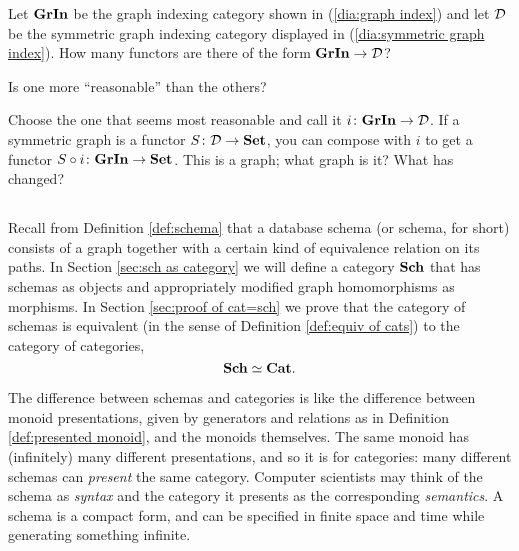 \documentclass[CT4S-EN-RU]{subfiles}
\begin{document}
\begin{exerciseRUS}
\end{exerciseRUS}

\begin{exerciseENG}
Let ${\mathbf{GrIn}}$ be the graph indexing category shown in (\ref{dia:graph index}) and let $\mathcal{D}$ be the symmetric graph indexing category displayed in (\ref{dia:symmetric graph index}).
\sexc How many functors are there of the form ${\mathbf{GrIn}}\rightarrow\mathcal{D}$?
\item Is one more “reasonable” than the others? 
\item Choose the one that seems most reasonable and call it $i\colon{\mathbf{GrIn}}\rightarrow\mathcal{D}$. If a symmetric graph is a functor $S\colon\mathcal{D}\rightarrow{\mathbf{Set}}$, you can compose with $i$ to get a functor $S\circ i\colon{\mathbf{GrIn}}\rightarrow{\mathbf{Set}}$. This is a graph; what graph is it? What has changed?
\endsexc
\end{exerciseENG}

\begin{exerciseRUS}
\end{exerciseRUS}


\subsection{}\label{sec:schemas and cats intro}

\begin{blockENG}
Recall from Definition \ref{def:schema} that a database schema (or schema, for short) consists of a graph together with a certain kind of equivalence relation on its paths. In Section \ref{sec:sch as category} we will define a category ${\mathbf{Sch}}$ that has schemas as objects and appropriately modified graph homomorphisms as morphisms. In Section \ref{sec:proof of cat=sch} we prove that the category of schemas is equivalent (in the sense of Definition \ref{def:equiv of cats}) to the category of categories, $${\mathbf{Sch}}\simeq{\mathbf{Cat}}.$$
\end{blockENG}

\begin{blockRUS}
\end{blockRUS}

\begin{blockENG}
The difference between schemas and categories is like the difference between monoid presentations, given by generators and relations as in Definition \ref{def:presented monoid}, and the monoids themselves. The same monoid has (infinitely) many different presentations, and so it is for categories: many different schemas can {\em present} the same category. Computer scientists may think of the schema as {\em syntax} and the category it presents as the corresponding {\em semantics}. A schema is a compact form, and can be specified in finite space and time while generating something infinite. 
\end{blockENG}
\end{document}
